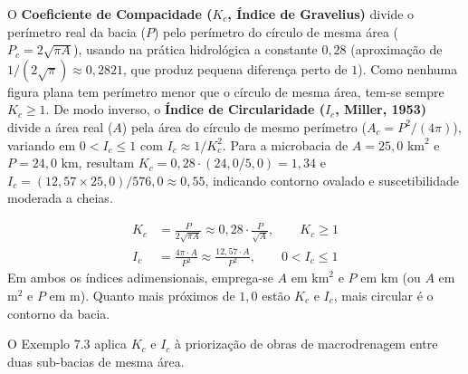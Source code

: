 O \textbf{Coeficiente de Compacidade ($K_c$, Índice de Gravelius)} divide o perímetro real da bacia ($P$) pelo perímetro do círculo de mesma área ($P_c = 2\sqrt{\pi A}$), usando na prática hidrológica a constante $0{,}28$ (aproximação de $1/(2\sqrt{\pi}) \approx 0{,}2821$, que produz pequena diferença perto de $1$). Como nenhuma figura plana tem perímetro menor que o círculo de mesma área, tem-se sempre $K_c \ge 1$. De modo inverso, o \textbf{Índice de Circularidade ($I_c$, Miller, 1953)} divide a área real ($A$) pela área do círculo de mesmo perímetro ($A_c = P^2 / (4\pi)$), variando em $0 < I_c \le 1$ com $I_c \approx 1 / K_c^2$. Para a microbacia de $A = 25{,}0\text{ km}^2$ e $P = 24{,}0\text{ km}$, resultam $K_c = 0{,}28 \cdot (24{,}0 / 5{,}0) = 1{,}34$ e $I_c = (12{,}57 \times 25{,}0) / 576{,}0 \approx 0{,}55$, indicando contorno ovalado e suscetibilidade moderada a cheias.

\begin{boxFormula}
\begin{align*}
  K_c &= \frac{P}{2\sqrt{\pi A}} \approx 0{,}28 \cdot \frac{P}{\sqrt{A}}, \qquad K_c \ge 1 \\[4pt]
  I_c &= \frac{4\pi \cdot A}{P^2} \approx \frac{12{,}57 \cdot A}{P^2}, \qquad 0 < I_c \le 1
\end{align*}
Em ambos os índices adimensionais, emprega-se $A$ em $\text{km}^2$ e $P$ em $\text{km}$ (ou $A$ em $\text{m}^2$ e $P$ em $\text{m}$). Quanto mais próximos de $1{,}0$ estão $K_c$ e $I_c$, mais circular é o contorno da bacia.
\end{boxFormula}

O Exemplo 7.3 aplica $K_c$ e $I_c$ à priorização de obras de macrodrenagem entre duas sub-bacias de mesma área.

